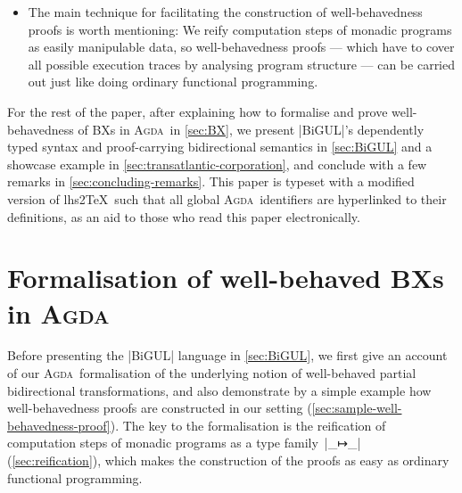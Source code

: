 \documentclass{sigplanconf}
\newcommand{\BiGUL}{\textsc{BiGUL}}
\newcommand{\Agda}{\textsc{Agda}}
\begin{document}
\begin{itemize}[leftmargin=*]
\item The main technique for facilitating the construction of well-behavedness proofs is worth mentioning: We reify computation steps of monadic programs as easily manipulable data, so well-behavedness proofs --- which have to cover all possible execution traces by analysing program structure --- can be carried out just like doing ordinary functional programming.
\end{itemize}
%


For the rest of the paper, after explaining how to formalise and prove well-behavedness of BXs in \Agda\ in \autoref{sec:BX}, we present |BiGUL|'s dependently typed syntax and proof-carrying bidirectional semantics in \autoref{sec:BiGUL} and a showcase example in \autoref{sec:transatlantic-corporation}, and conclude with a few remarks in \autoref{sec:concluding-remarks}.
This paper is typeset with a modified version of lhs2\TeX\ such that all global \Agda\ identifiers are hyperlinked to their definitions, as an aid to those who read this paper electronically.


\section{Formalisation of well-behaved BXs in \Agda}
\label{sec:BX}

Before presenting the |BiGUL| language in \autoref{sec:BiGUL}, we first give an account of our \Agda\ formalisation of the underlying notion of well-behaved partial bidirectional transformations, and also demonstrate by a simple example how well-behavedness proofs are constructed in our setting (\autoref{sec:sample-well-behavedness-proof}).
The key to the formalisation is the reification of computation steps of monadic programs as a type family~|_↦_| (\autoref{sec:reification}), which makes the construction of the proofs as easy as ordinary functional programming.
\end{document}
